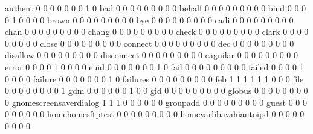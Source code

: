 \documentclass[compress,8pt]{beamer}
\begin{document}
\begin{frame}
\begin{Schunk}
  authent                                    0   0   0   0   0   0   0   1   0
  bad                                        0   0   0   0   0   0   0   0   0
  behalf                                     0   0   0   0   0   0   0   0   0
  bind                                       0   0   0   0   1   0   0   0   0
  brown                                      0   0   0   0   0   0   0   0   0
  bye                                        0   0   0   0   0   0   0   0   0
  cadi                                       0   0   0   0   0   0   0   0   0
  chan                                       0   0   0   0   0   0   0   0   0
  chang                                      0   0   0   0   0   0   0   0   0
  check                                      0   0   0   0   0   0   0   0   0
  clark                                      0   0   0   0   0   0   0   0   0
  close                                      0   0   0   0   0   0   0   0   0
  connect                                    0   0   0   0   0   0   0   0   0
  dec                                        0   0   0   0   0   0   0   0   0
  disallow                                   0   0   0   0   0   0   0   0   0
  disconnect                                 0   0   0   0   0   0   0   0   0
  eaguilar                                   0   0   0   0   0   0   0   0   0
  error                                      0   0   0   0   1   0   0   0   0
  euid                                       0   0   0   0   0   0   0   1   0
  fail                                       0   0   0   0   0   0   0   0   0
  failed                                     0   0   0   0   1   0   0   0   0
  failure                                    0   0   0   0   0   0   0   1   0
  failures                                   0   0   0   0   0   0   0   0   0
  feb                                        1   1   1   1   1   1   0   0   0
  file                                       0   0   0   0   0   0   0   0   1
  gdm                                        0   0   0   0   0   0   1   0   0
  gid                                        0   0   0   0   0   0   0   0   0
  globus                                     0   0   0   0   0   0   0   0   0
  gnomescreensaverdialog                     1   1   1   0   0   0   0   0   0
  groupadd                                   0   0   0   0   0   0   0   0   0
  guest                                      0   0   0   0   0   0   0   0   0
  homehomesftptest                           0   0   0   0   0   0   0   0   0
  homevarlibavahiautoipd                     0   0   0   0   0   0   0   0   0

\end{Schunk}
\end{frame}
\end{document}
